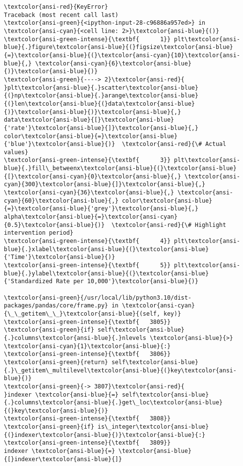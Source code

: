 \documentclass[11pt]{article}
\begin{document}
\begin{Verbatim}[commandchars=\\\{\}, frame=single, framerule=2mm, rulecolor=\color{outerrorbackground}]
\textcolor{ansi-red}{KeyError}                                  Traceback (most recent call last)
\textcolor{ansi-green}{<ipython-input-28-c96886a957ed>} in \textcolor{ansi-cyan}{<cell line: 2>}\textcolor{ansi-blue}{()}
\textcolor{ansi-green-intense}{\textbf{      1}} plt\textcolor{ansi-blue}{.}figure\textcolor{ansi-blue}{(}figsize\textcolor{ansi-blue}{=}\textcolor{ansi-blue}{(}\textcolor{ansi-cyan}{10}\textcolor{ansi-blue}{,} \textcolor{ansi-cyan}{6}\textcolor{ansi-blue}{)}\textcolor{ansi-blue}{)}
\textcolor{ansi-green}{----> 2}\textcolor{ansi-red}{ }plt\textcolor{ansi-blue}{.}scatter\textcolor{ansi-blue}{(}np\textcolor{ansi-blue}{.}arange\textcolor{ansi-blue}{(}len\textcolor{ansi-blue}{(}data\textcolor{ansi-blue}{)}\textcolor{ansi-blue}{)}\textcolor{ansi-blue}{,} data\textcolor{ansi-blue}{[}\textcolor{ansi-blue}{'rate'}\textcolor{ansi-blue}{]}\textcolor{ansi-blue}{,} color\textcolor{ansi-blue}{=}\textcolor{ansi-blue}{'blue'}\textcolor{ansi-blue}{)}  \textcolor{ansi-red}{\# Actual values}
\textcolor{ansi-green-intense}{\textbf{      3}} plt\textcolor{ansi-blue}{.}fill\_betweenx\textcolor{ansi-blue}{(}\textcolor{ansi-blue}{[}\textcolor{ansi-cyan}{0}\textcolor{ansi-blue}{,} \textcolor{ansi-cyan}{300}\textcolor{ansi-blue}{]}\textcolor{ansi-blue}{,} \textcolor{ansi-cyan}{36}\textcolor{ansi-blue}{,} \textcolor{ansi-cyan}{60}\textcolor{ansi-blue}{,} color\textcolor{ansi-blue}{=}\textcolor{ansi-blue}{'grey'}\textcolor{ansi-blue}{,} alpha\textcolor{ansi-blue}{=}\textcolor{ansi-cyan}{0.5}\textcolor{ansi-blue}{)}  \textcolor{ansi-red}{\# Highlight intervention period}
\textcolor{ansi-green-intense}{\textbf{      4}} plt\textcolor{ansi-blue}{.}xlabel\textcolor{ansi-blue}{(}\textcolor{ansi-blue}{'Time'}\textcolor{ansi-blue}{)}
\textcolor{ansi-green-intense}{\textbf{      5}} plt\textcolor{ansi-blue}{.}ylabel\textcolor{ansi-blue}{(}\textcolor{ansi-blue}{'Standardized Rate per 10,000'}\textcolor{ansi-blue}{)}

\textcolor{ansi-green}{/usr/local/lib/python3.10/dist-packages/pandas/core/frame.py} in \textcolor{ansi-cyan}{\_\_getitem\_\_}\textcolor{ansi-blue}{(self, key)}
\textcolor{ansi-green-intense}{\textbf{   3805}}             \textcolor{ansi-green}{if} self\textcolor{ansi-blue}{.}columns\textcolor{ansi-blue}{.}nlevels \textcolor{ansi-blue}{>} \textcolor{ansi-cyan}{1}\textcolor{ansi-blue}{:}
\textcolor{ansi-green-intense}{\textbf{   3806}}                 \textcolor{ansi-green}{return} self\textcolor{ansi-blue}{.}\_getitem\_multilevel\textcolor{ansi-blue}{(}key\textcolor{ansi-blue}{)}
\textcolor{ansi-green}{-> 3807}\textcolor{ansi-red}{             }indexer \textcolor{ansi-blue}{=} self\textcolor{ansi-blue}{.}columns\textcolor{ansi-blue}{.}get\_loc\textcolor{ansi-blue}{(}key\textcolor{ansi-blue}{)}
\textcolor{ansi-green-intense}{\textbf{   3808}}             \textcolor{ansi-green}{if} is\_integer\textcolor{ansi-blue}{(}indexer\textcolor{ansi-blue}{)}\textcolor{ansi-blue}{:}
\textcolor{ansi-green-intense}{\textbf{   3809}}                 indexer \textcolor{ansi-blue}{=} \textcolor{ansi-blue}{[}indexer\textcolor{ansi-blue}{]}


\end{Verbatim}
\end{document}
